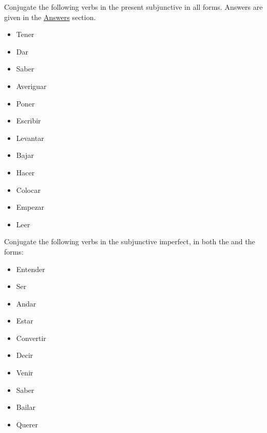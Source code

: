 Conjugate the following verbs in the present subjunctive in all forms. Answers are given in the \hyperref[sec:ans]{Answers} section.

\begin{itemize}[before=\itshape,font=\normalfont,noitemsep]
	\item Tener
	\item Dar
	\item Saber
	\item Averiguar
	\item Poner
	\item Escribir
	\item Levantar
	\item Bajar
	\item Hacer
	\item Colocar
	\item Empezar
	\item Leer
\end{itemize}

Conjugate the following verbs in the subjunctive imperfect, in both the  and the  forms:
\begin{itemize}[before=\itshape,font=\normalfont,noitemsep]
	\item Entender
	\item Ser
	\item Andar
	\item Estar
	\item Convertir
	\item Decir
	\item Venir
	\item Saber
	\item Bailar
	\item Querer
\end{itemize}

